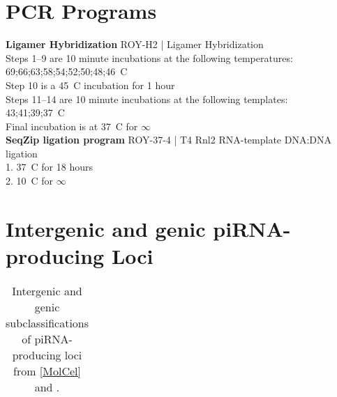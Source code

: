 \section{PCR Programs}\label{AppendixMisc:sec:PCR Programs}

\textbf{Ligamer Hybridization}
ROY-H2 | Ligamer Hybridization\\
  Steps 1–9 are 10 minute incubations at the following temperatures:\\
  69;66;63;58;54;52;50;48;46\degree~C\\
  Step 10 is a 45\degree~C incubation for 1 hour\\
  Steps 11–14 are 10 minute incubations at the following templates:\\
  43;41;39;37\degree~C\\
  Final incubation is at 37\degree~C for $\infty$\\

\textbf{SeqZip ligation program}
ROY-37-4 | T4 Rnl2 RNA-template DNA:DNA ligation\\
  1. 37\degree~C for 18 hours\\
  2. 10\degree~C for $\infty$ \\

\section{Intergenic and genic piRNA-producing Loci}



\begin{longtable}{c|c} %
  \caption[Intergenic and genic subclassifications of piRNA-producing loci]
  {Intergenic and genic subclassifications of piRNA-producing loci from \ref{MolCel} and \citep{Li2013e}.}
  \label{Appendix:tab:GenicAndInterGenicLoci}
  
  \end{longtable}

